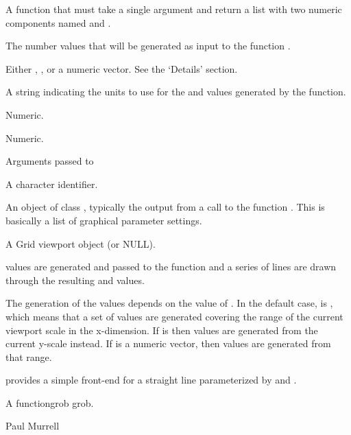 %
\begin{Arguments}
\begin{ldescription}
\item[\code{f}]  A function that must take a single argument
and return a list with two numeric components named  and
.
\item[\code{n}]  The number values that will be generated as input
to the function .
\item[\code{range}]  Either , , or a numeric vector.
See the `Details' section.
\item[\code{units}] A string indicating the units to use
for the  and  values generated by the function.
\item[\code{intercept}]  Numeric.
\item[\code{slope}]  Numeric. 
\item[\code{...}]  Arguments passed to 
\item[\code{name}]  A character identifier. 
\item[\code{gp}] An object of class , typically the output
from a call to the function .  This is basically
a list of graphical parameter settings.
\item[\code{vp}] A Grid viewport object (or NULL).
\end{ldescription}
\end{Arguments}
%
\begin{Details}\relax
{} values are generated and passed to the function 
and a series of lines are
drawn through the resulting  and  values.

The generation of the  values depends on the value of 
.  In the default case,  is
, which means that a set
of  values are generated covering the range of the current
viewport scale in the x-dimension.  If  is 
then values are generated from the current y-scale instead.
If  is a numeric vector, then values are generated
from that range.

 provides a simple front-end for a straight
line parameterized by  and .
\end{Details}
%
\begin{Value}
A functiongrob grob.
\end{Value}
%
\begin{Author}\relax
Paul Murrell
\end{Author}
